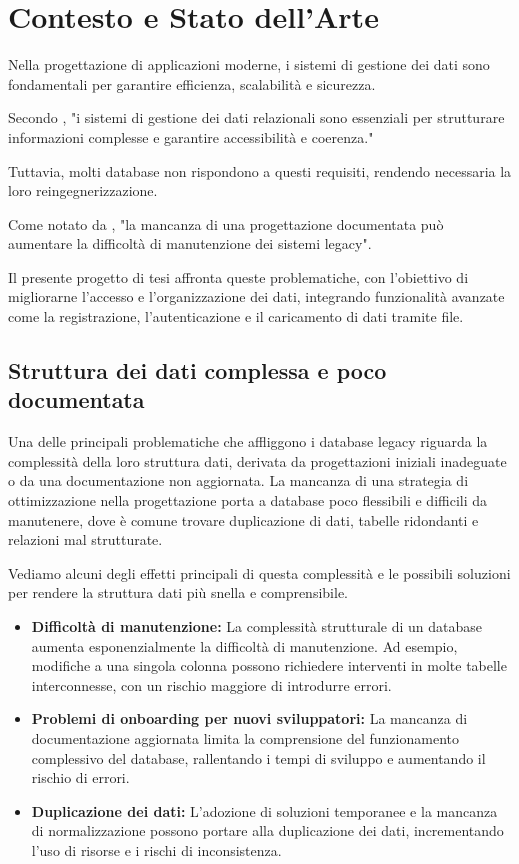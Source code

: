 \clearpage{\pagestyle{empty}\cleardoublepage}
\chapter{Contesto e Stato dell’Arte}

Nella progettazione di applicazioni moderne, i sistemi di gestione dei dati sono fondamentali per garantire efficienza, scalabilità e sicurezza.

Secondo \cite{Elm17}, "i sistemi di gestione dei dati relazionali sono essenziali per strutturare informazioni complesse e garantire accessibilità e coerenza."

Tuttavia, molti database non rispondono a questi requisiti, rendendo necessaria la loro reingegnerizzazione.

Come notato da \cite{Cod70}, "la mancanza di una progettazione documentata può aumentare la difficoltà di manutenzione dei sistemi legacy".

Il presente progetto di tesi affronta queste problematiche, con l'obiettivo di migliorarne l'accesso e l'organizzazione dei dati, integrando funzionalità avanzate come la registrazione, l'autenticazione e il caricamento di dati tramite file.


\section{Struttura dei dati complessa e poco documentata}
Una delle principali problematiche che affliggono i database legacy riguarda la complessità della loro struttura dati, derivata da progettazioni iniziali inadeguate o da una documentazione non aggiornata. La mancanza di una strategia di ottimizzazione nella progettazione porta a database poco flessibili e difficili da manutenere, dove è comune trovare duplicazione di dati, tabelle ridondanti e relazioni mal strutturate. 

Vediamo alcuni degli effetti principali di questa complessità e le possibili soluzioni per rendere la struttura dati più snella e comprensibile.


\begin{itemize}
    \item \textbf{Difficoltà di manutenzione:} La complessità strutturale di un database aumenta esponenzialmente la difficoltà di manutenzione. Ad esempio, modifiche a una singola colonna possono richiedere interventi in molte tabelle interconnesse, con un rischio maggiore di introdurre errori.
    \item \textbf{Problemi di onboarding per nuovi sviluppatori:} La mancanza di documentazione aggiornata limita la comprensione del funzionamento complessivo del database, rallentando i tempi di sviluppo e aumentando il rischio di errori.
    \item \textbf{Duplicazione dei dati:} L’adozione di soluzioni temporanee e la mancanza di normalizzazione possono portare alla duplicazione dei dati, incrementando l’uso di risorse e i rischi di inconsistenza.
\end{itemize}

